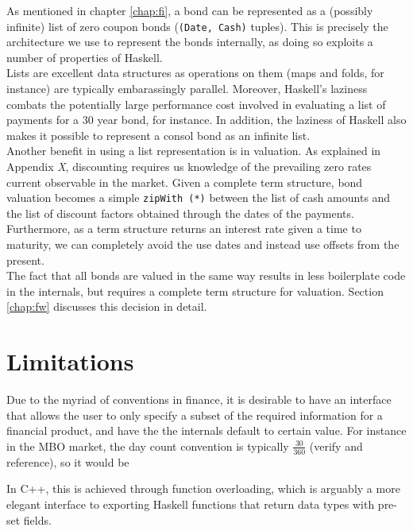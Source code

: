 As mentioned in chapter \ref{chap:fi}, a bond can be represented as a (possibly
infinite) list of zero coupon bonds (\texttt{(Date, Cash)} tuples).
This is precisely the architecture we use to represent the bonds internally, as
doing so exploits a number of properties of Haskell.\\

Lists are excellent data structures as operations on them (maps and
folds, for instance) are typically embarassingly parallel. Moreover,
Haskell's laziness combats the potentially large performance cost involved in
evaluating a list of payments for a 30 year bond, for instance. In addition,
the laziness of Haskell also makes it possible to represent a consol bond as
an infinite list.\\

Another benefit in using a list representation is in valuation. As explained
in Appendix \emph{X}, discounting requires us knowledge of the prevailing zero
rates current observable in the market. Given a complete term
structure, bond valuation becomes a simple \texttt{zipWith (*)} between the list
of cash amounts and the list of discount factors obtained through the dates of
the payments. Furthermore, as a term structure returns an interest rate given
a time to maturity, we can completely avoid the use dates and instead use
offsets from the present.\\

The fact that all bonds are valued in the same way results in less boilerplate
code in the internals, but requires a complete term structure for valuation.
Section \ref{chap:fw} discusses this decision in detail.

\section{Limitations}

Due to the myriad of conventions in finance, it is desirable to have an
interface that allows the user to only specify a subset of the required
information for a financial product, and have the the internals default
to certain value. For instance in the MBO market, the day count convention
is typically $\frac{30}{360}$ (verify and reference), so it would be 

In C++, this is achieved through function overloading, which is arguably a
more elegant interface to exporting Haskell functions that return data types
with pre-set fields.

